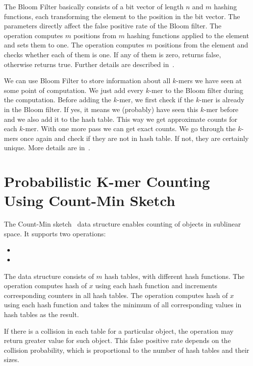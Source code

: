 The Bloom Filter basically consists of a bit vector of length $n$ and $m$ hashing functions, each transforming the element to the position in the bit vector. The parameters directly affect the false positive rate of the Bloom filter.
The  operation computes $m$ positions from $m$ hashing functions applied to the element and sets them to one.
The  operation computes $m$ positions from the element and checks whether each of them is one. If any of them is zero, returns false, otherwise returns true. Further details are described in~\cite{bloomfilter}.

We can use Bloom Filter to store information about all $k$-mers we have seen at some point of computation. We just add every $k$-mer to the Bloom filter during the computation. Before adding the $k$-mer, we first check if the $k$-mer is already in the Bloom filter. If yes, it means we (probably) have seen this $k$-mer before and we also add it to the hash table. This way we get approximate counts for each $k$-mer.
With one more pass we can get exact counts. We go through the $k$-mers once again and check if they are not in hash table. If not, they are certainly unique. More details are in~\cite{bfcounter}.

\section[Probabilistic K-mer Counting]{Probabilistic K-mer Counting Using Count-Min Sketch}

The Count-Min sketch~\cite{countminsketch} data structure enables counting of objects in sublinear space. It supports two operations:
\begin{itemize}
  \item {} %
  \item {} %
\end{itemize}

The data structure consists of $m$ hash tables, with different hash functions.
The  operation computes hash of $x$ using each hash function and increments corresponding counters in all hash tables. The  operation computes hash of $x$ using each hash function and takes the minimum of all corresponding values in hash tables as the result. %

If there is a collision in each table for a particular object, the  operation may return greater value for such object. This false positive rate depends on the collision probability, which is proportional to the number of hash tables and their sizes.

